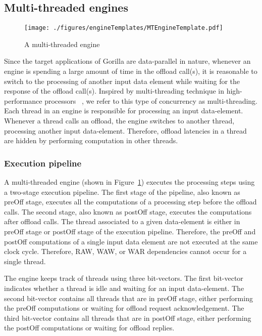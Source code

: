 \documentclass[a4paper, 12pt]{report}
\begin{document}
\subsection{Multi-threaded engines}
\begin{figure}
\begin{center}
  \texttt{[image: ./figures/engineTemplates/MTEngineTemplate.pdf]}
  \caption{A multi-threaded engine}
  \label{fig:MTTemplate}
\end{center}
\end{figure}
Since the target applications of Gorilla are data-parallel 
in nature, whenever an engine is spending a large amount 
of time in the offload call(s), it is reasonable to switch 
to the processing of another input data element while 
waiting for the response of the offload call(s). Inspired by 
multi-threading technique in high-performance processors
~\cite{SMT}, we refer to this type of concurrency 
as multi-threading. Each thread in an engine is responsible 
for processing an input data-element. Whenever a thread 
calls an offload, the engine switches to another thread, 
processing another input data-element. Therefore, offload 
latencies in a thread are hidden by performing computation in 
other threads. 
 
\subsubsection{Execution pipeline}
A multi-threaded engine (shown in Figure~\ref{fig:MTTemplate}) 
executes the processing steps using a two-stage execution 
pipeline. The first stage of the pipeline, also known as preOff 
stage, executes all the computations of a processing step 
before the offload calls. The second stage, also known as 
postOff stage, executes the computations after offload calls. 
The thread associated to a given data-element is either in 
preOff stage or postOff stage of the execution pipeline. 
Therefore, the preOff and postOff computations of a single 
input data element are not executed at the same clock cycle. 
Therefore, RAW, WAW, or WAR dependencies cannot occur for a 
single thread. 

The engine keeps track of threads using three bit-vectors. 
The first bit-vector indicates whether a thread is idle and 
waiting for an input data-element. The second bit-vector 
contains all threads that are in preOff stage, either 
performing the preOff computations or waiting for offload 
request acknowledgement. The third bit-vector contains all 
threads that are in postOff stage, either performing the 
postOff computations or waiting for offload replies. 
 
\end{document}
